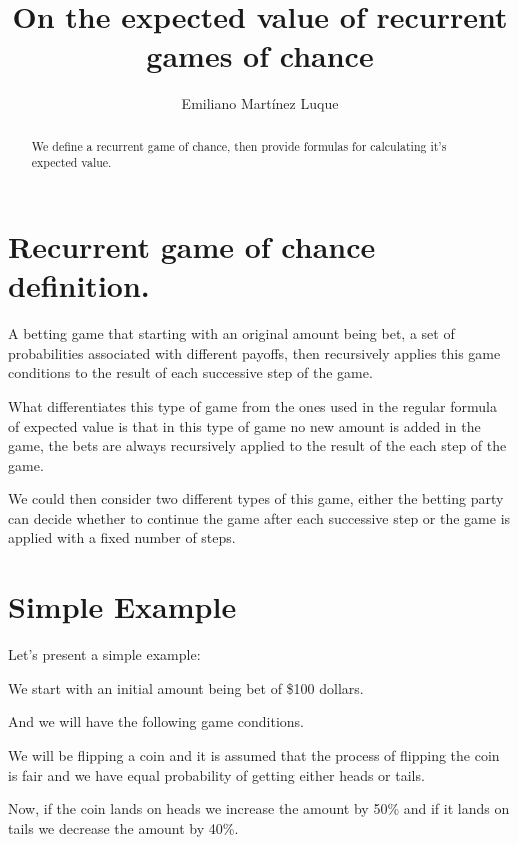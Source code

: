\documentclass[12pt,reqno]{amsart}
\begin{document}
\title[On the expected value of recurrent games of chance]{On the expected value of recurrent games of chance}
\author{Emiliano Martínez Luque}
\maketitle

\begin{abstract}
We define a recurrent game of chance, then provide formulas for calculating it's expected value.
\end{abstract}

\section{Recurrent game of chance definition.}
\label{first section}


A betting game that starting with an original amount being bet, a set of probabilities associated with different payoffs, then recursively applies this game conditions to the result of each successive step of the game. 

What differentiates this type of game from the ones used in the regular formula of expected value is that in this type of game no new amount is added in the game, the bets are always recursively applied to the result of the each step of the game.

We could then consider two different types of this game, either the betting party can decide whether to continue the game after each successive step or the game is applied with a fixed number of steps.

\section{Simple Example}

Let's present a simple example:


We start with an initial amount being bet of \$100 dollars. 


And we will have the following game conditions.


We will be flipping a coin and it is assumed that the process of flipping the coin is fair and we have equal probability of getting either heads or tails. 

Now, if the coin lands on heads we increase the amount by 50\% and if it lands on tails we decrease the amount by 40\%.
\end{document}
